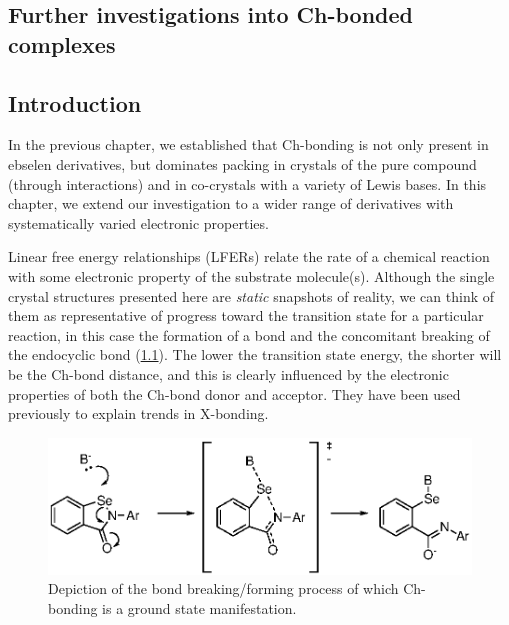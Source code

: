 \begin{refsection}

\chapter{Further investigations into Ch-bonded complexes}\label{ch:hammett}

\section{Introduction}
In the previous chapter, we established that Ch-bonding is not only present in ebselen derivatives, but dominates packing in crystals of the pure compound (through  interactions) and in co-crystals with a variety of Lewis bases.
In this chapter, we extend our investigation to a wider range of derivatives with systematically varied electronic properties.

Linear free energy relationships (LFERs) relate the rate of a chemical reaction with some electronic property of the substrate molecule(s).
Although the single crystal structures presented here are \emph{static} snapshots of reality, we can think of them as representative of progress toward the transition state for a particular reaction, in this case the formation of a  bond and the concomitant breaking of the endocyclic  bond (\cref{fig:bond-breaking}).
The lower the transition state energy, the shorter will be the  Ch-bond distance, and this is clearly influenced by the electronic properties of both the Ch-bond donor and acceptor.
They have been used previously to explain trends in X-bonding.\autocite{Laurence1983,Sarwar2010}

\begin{figure}
  \includegraphics[scale=0.74]{Figures/bond-breaking.eps}
  \caption[Nucleophilic substitution at selenium.]{Depiction of the bond breaking/forming process of which Ch-bonding is a ground state manifestation.}\label{fig:bond-breaking}
\end{figure}


\end{refsection}
